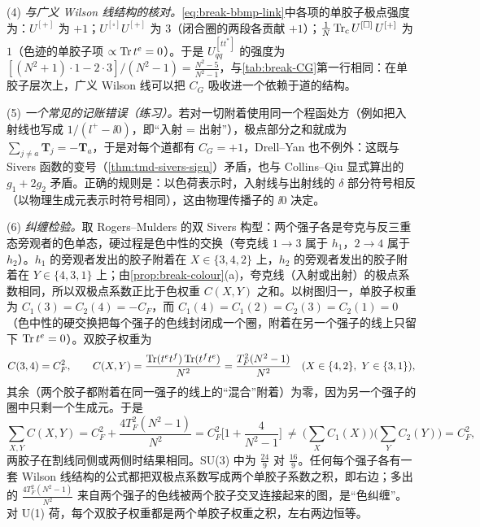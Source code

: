 \begin{example}
(4) \emph{与广义 Wilson 线结构的核对。}\cref{eq:break-bbmp-link}中各项的单胶子极点强度为：$U^{[+]}$ 为 $+1$；$U^{[\square]}U^{[+]}$ 为 $3$（闭合圈的两段各贡献 $+1$）；$\frac1N\operatorname{Tr}_{\mathrm{c}} U^{[\square]}\,U^{[+]}$ 为 $1$（色迹的单胶子项 $\propto\operatorname{Tr} t^e=0$）。于是 $U^{[tt^*]}_{qq}$ 的强度为 $[(N^2+1)\cdot1-2\cdot3]/(N^2-1)=\frac{N^2-5}{N^2-1}$，与\cref{tab:break-CG}第一行相同：在单胶子层次上，广义 Wilson 线可以把 $C_G$ 吸收进一个依赖于道的结构。

(5) \emph{一个常见的记账错误（练习）。}若对一切附着使用同一个程函处方（例如把入射线也写成 $1/(l^+-\ii0)$，即“入射 = 出射”），极点部分之和就成为 $\sum_{j\neq a}\mathbf T_j=-\mathbf T_a$，于是对每个道都有 $C_G=+1$，Drell--Yan 也不例外：这既与 Sivers 函数的变号（\cref{thm:tmd-sivers-sign}）矛盾，也与 Collins--Qiu 显式算出的 $g_1+2g_2$ 矛盾。正确的规则是：以色荷表示时，入射线与出射线的 $\delta$ 部分符号相反（以物理生成元表示时符号相同），这由物理传播子的 $\ii0$ 决定。

(6) \emph{纠缠检验。}取 Rogers--Mulders 的双 Sivers 构型\cite{RogersMulders2010}：两个强子各是夸克与反三重态旁观者的色单态，硬过程是色中性的交换（夸克线 $1\to3$ 属于 $h_1$，$2\to4$ 属于 $h_2$）。$h_1$ 的旁观者发出的胶子附着在 $X\in\{3,4,2\}$ 上，$h_2$ 的旁观者发出的胶子附着在 $Y\in\{4,3,1\}$ 上；由\cref{prop:break-colour}(a)，夸克线（入射或出射）的极点系数相同，所以双极点系数正比于色权重 $C(X,Y)$ 之和。以树图归一，单胶子权重为 $C_1(3)=C_2(4)=-C_F$，而 $C_1(4)=C_1(2)=C_2(3)=C_2(1)=0$（色中性的硬交换把每个强子的色线封闭成一个圈，附着在另一个强子的线上只留下 $\operatorname{Tr} t^e=0$）。双胶子权重为
\begin{equation}\label{eq:break-entangle-weights}
C(3,4)=C_F^2,\qquad C(X,Y)=\frac{\Tr(t^et^f)\Tr(t^ft^e)}{N^2}=\frac{T_F^2(N^2-1)}{N^2}\quad(X\in\{4,2\},\ Y\in\{3,1\}),
\end{equation}
其余（两个胶子都附着在同一强子的线上的“混合”附着）为零，因为另一个强子的圈中只剩一个生成元。于是
\begin{equation}\label{eq:break-entangle}
\sum_{X,Y}C(X,Y)=C_F^2+\frac{4T_F^2(N^2-1)}{N^2}=C_F^2\Big[1+\frac{4}{N^2-1}\Big]\ \neq\ \Big(\sum_XC_1(X)\Big)\Big(\sum_YC_2(Y)\Big)=C_F^2 ,
\end{equation}
两胶子在割线同侧或两侧时结果相同。SU(3) 中为 $\frac{24}9$ 对 $\frac{16}9$。任何每个强子各有一套 Wilson 线结构的公式都把双极点系数写成两个单胶子系数之积，即右边；多出的 $\frac{4T_F^2(N^2-1)}{N^2}$ 来自两个强子的色线被两个胶子交叉连接起来的图，是“色纠缠”。对 U(1) 荷，每个双胶子权重都是两个单胶子权重之积，左右两边恒等。
\end{example}

